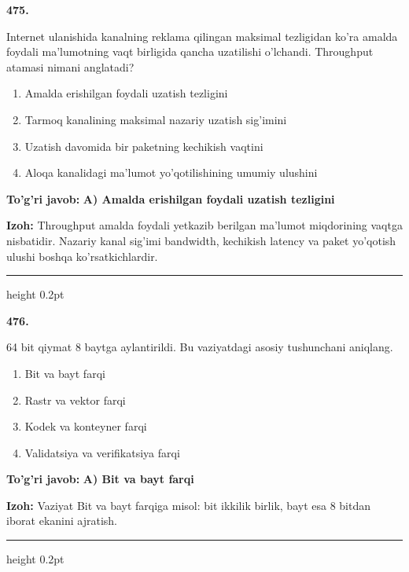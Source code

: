 \documentclass[10pt,a4paper,oneside]{article}
\begin{document}
\noindent\textbf{\color{ink}475.}
\par
Internet ulanishida kanalning reklama qilingan maksimal tezligidan ko'ra amalda foydali ma'lumotning vaqt birligida qancha uzatilishi o'lchandi. Throughput atamasi nimani anglatadi?
\begin{enumerate}[label=\Alph*),leftmargin=9mm]
\item Amalda erishilgan foydali uzatish tezligini
\item Tarmoq kanalining maksimal nazariy uzatish sig'imini
\item Uzatish davomida bir paketning kechikish vaqtini
\item Aloqa kanalidagi ma'lumot yo'qotilishining umumiy ulushini
\end{enumerate}
\begin{tcolorbox}[enhanced,breakable,colback=teal!4,colframe=teal!50!black,boxrule=0.5pt,arc=1.1mm,left=3mm,right=3mm,top=1.7mm,bottom=1.7mm,before skip=2mm,after skip=2mm]
\textbf{\color{teal}To'g'ri javob:} \textbf{A) Amalda erishilgan foydali uzatish tezligini}
\par\smallskip
\textbf{Izoh:} Throughput amalda foydali yetkazib berilgan ma'lumot miqdorining vaqtga nisbatidir. Nazariy kanal sig'imi bandwidth, kechikish latency va paket yo'qotish ulushi boshqa ko'rsatkichlardir.
\end{tcolorbox}
\vspace{2mm}\hrule height 0.2pt \vspace{3mm}

\noindent\textbf{\color{ink}476.}
\par
64 bit qiymat 8 baytga aylantirildi. Bu vaziyatdagi asosiy tushunchani aniqlang.
\begin{enumerate}[label=\Alph*),leftmargin=9mm]
\item Bit va bayt farqi
\item Rastr va vektor farqi
\item Kodek va konteyner farqi
\item Validatsiya va verifikatsiya farqi
\end{enumerate}
\begin{tcolorbox}[enhanced,breakable,colback=teal!4,colframe=teal!50!black,boxrule=0.5pt,arc=1.1mm,left=3mm,right=3mm,top=1.7mm,bottom=1.7mm,before skip=2mm,after skip=2mm]
\textbf{\color{teal}To'g'ri javob:} \textbf{A) Bit va bayt farqi}
\par\smallskip
\textbf{Izoh:} Vaziyat Bit va bayt farqiga misol: bit ikkilik birlik, bayt esa 8 bitdan iborat ekanini ajratish.
\end{tcolorbox}
\vspace{2mm}\hrule height 0.2pt \vspace{3mm}
\end{document}
